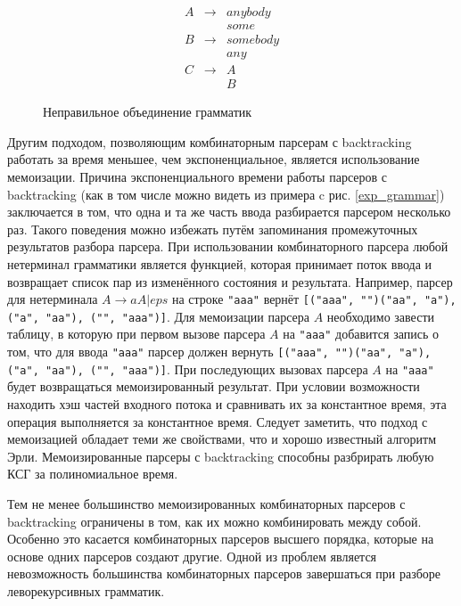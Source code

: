 \documentclass[times]{itmo-student-thesis}
\begin{document}
\begin{figure}[!h]
    \caption{Неправильное объединение грамматик}\label{uncomposable_grammar}
    \[
        \begin{array}{lll}
            A & \to & anybody \\
              &     & some  \\
            B & \to & somebody \\
              &     & any  \\
            C & \to & A  \\
              &     & B
        \end{array}
    \]
\end{figure}

Другим подходом, позволяющим комбинаторным парсерам с backtracking работать за время меньшее, чем экспоненциальное,
является использование мемоизации. Причина экспоненциального времени работы парсеров с backtracking (как в том числе
можно видеть из примера c рис. \ref{exp_grammar}) заключается в том, что одна и та же часть ввода разбирается
парсером несколько раз. Такого поведения можно избежать путём запоминания промежуточных результатов разбора парсера.
При использовании комбинаторного парсера любой нетерминал грамматики является функцией, которая принимает поток ввода и
возвращает список пар из изменённого состояния и результата. Например, парсер для нетерминала $A \to aA | eps$ на
строке \lstinline{"aaa"} вернёт \lstinline{[("aaa", "")("aa", "a"), ("a", "aa"), ("", "aaa")]}. Для мемоизации парсера
$A$ необходимо завести таблицу, в которую при первом вызове парсера $A$ на
\lstinline{"aaa"} добавится запись о том, что для ввода \lstinline{"aaa"} парсер должен вернуть
\lstinline{[("aaa", "")("aa", "a"), ("a", "aa"), ("", "aaa")]}. При последующих вызовах парсера $A$ на \lstinline{"aaa"}
будет возвращаться мемоизированный результат. При условии возможности находить хэш частей входного потока и сравнивать
их за константное время, эта операция выполняется за константное время. Следует заметить, что подход с мемоизацией
обладает теми же свойствами, что и хорошо известный алгоритм Эрли\cite{norvig_techniques_1991}. Мемоизированные парсеры с
backtracking способны разбрирать любую КСГ за полиномиальное время.

Тем не менее большинство мемоизированных комбинаторных парсеров с backtracking ограничены в том, как их можно
комбинировать между собой. Особенно это касается комбинаторных парсеров высшего порядка, которые на основе одних
парсеров создают другие. Одной из проблем является невозможность большинства комбинаторных парсеров завершаться при
разборе леворекурсивных грамматик.
\end{document}
